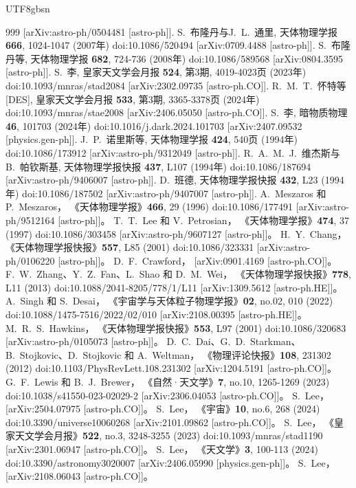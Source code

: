 \documentclass[jkps,preprint,fleqn]{revtex4}
\begin{document}
\begin{CJK*}{UTF8}{gbsn}
\begin{thebibliography}{999}
[arXiv:astro-ph/0504481 [astro-ph]].
S.~布隆丹与J.~L.~通里,
天体物理学报 \textbf{666}, 1024-1047 (2007年)
doi:10.1086/520494
[arXiv:0709.4488 [astro-ph]].
S.~布隆丹等,
天体物理学报 \textbf{682}, 724-736 (2008年)
doi:10.1086/589568
[arXiv:0804.3595 [astro-ph]].
S.~李,
皇家天文学会月报 \textbf{524}, 第3期, 4019-4023页 (2023年)
doi:10.1093/mnras/stad2084
[arXiv:2302.09735 [astro-ph.CO]].
R.~M.~T.~怀特等[DES],
皇家天文学会月报 \textbf{533}, 第3期, 3365-3378页 (2024年)
doi:10.1093/mnras/stae2008
[arXiv:2406.05050 [astro-ph.CO]].
S.~李,
暗物质物理 \textbf{46}, 101703 (2024年)
doi:10.1016/j.dark.2024.101703
[arXiv:2407.09532 [physics.gen-ph]].
J.~P.~诺里斯等,
天体物理学报 \textbf{424}, 540页 (1994年)
doi:10.1086/173912
[arXiv:astro-ph/9312049 [astro-ph]].
R.~A.~M.~J.~维杰斯与B.~帕钦斯基,
天体物理学报快报 \textbf{437}, L107 (1994年)
doi:10.1086/187694
[arXiv:astro-ph/9406007 [astro-ph]].
D.~班德,
天体物理学报快报 \textbf{432}, L23 (1994年)
doi:10.1086/187502
[arXiv:astro-ph/9407007 [astro-ph]].
A.~Meszaros 和 P.~Meszaros，
《天体物理学报》\textbf{466}, 29 (1996)
doi:10.1086/177491
[arXiv:astro-ph/9512164 [astro-ph]]。
T.~T.~Lee 和 V.~Petrosian，
《天体物理学报》\textbf{474}, 37 (1997)
doi:10.1086/303458
[arXiv:astro-ph/9607127 [astro-ph]]。
H.~Y.~Chang，
《天体物理学报快报》\textbf{557}, L85 (2001)
doi:10.1086/323331
[arXiv:astro-ph/0106220 [astro-ph]]。
D.~F.~Crawford，
[arXiv:0901.4169 [astro-ph.CO]]。
F.~W.~Zhang、Y.~Z.~Fan、L.~Shao 和 D.~M.~Wei，
《天体物理学报快报》\textbf{778}, L11 (2013)
doi:10.1088/2041-8205/778/1/L11
[arXiv:1309.5612 [astro-ph.HE]]。
A.~Singh 和 S.~Desai，
《宇宙学与天体粒子物理学报》\textbf{02}, no.02, 010 (2022)
doi:10.1088/1475-7516/2022/02/010
[arXiv:2108.00395 [astro-ph.HE]]。
M.~R.~S.~Hawkins，
《天体物理学报快报》\textbf{553}, L97 (2001)
doi:10.1086/320683
[arXiv:astro-ph/0105073 [astro-ph]]。
D.~C.~Dai、G.~D.~Starkman、B.~Stojkovic、D.~Stojkovic 和 A.~Weltman，
《物理评论快报》\textbf{108}, 231302 (2012)
doi:10.1103/PhysRevLett.108.231302
[arXiv:1204.5191 [astro-ph.CO]]。
G.~F.~Lewis 和 B.~J.~Brewer，
《自然·天文学》\textbf{7}, no.10, 1265-1269 (2023)
doi:10.1038/s41550-023-02029-2
[arXiv:2306.04053 [astro-ph.CO]]。
S.~Lee，
[arXiv:2504.07975 [astro-ph.CO]]。
S.~Lee，
《宇宙》\textbf{10}, no.6, 268 (2024)
doi:10.3390/universe10060268
[arXiv:2101.09862 [astro-ph.CO]]。
S.~Lee，
《皇家天文学会月报》\textbf{522}, no.3, 3248-3255 (2023)
doi:10.1093/mnras/stad1190
[arXiv:2301.06947 [astro-ph.CO]]。
S.~Lee，
《天文学》\textbf{3}, 100-113 (2024)
doi:10.3390/astronomy3020007
[arXiv:2406.05990 [physics.gen-ph]]。
S.~Lee，
[arXiv:2108.06043 [astro-ph.CO]]。
\end{thebibliography}
\end{CJK*}
\end{document}
